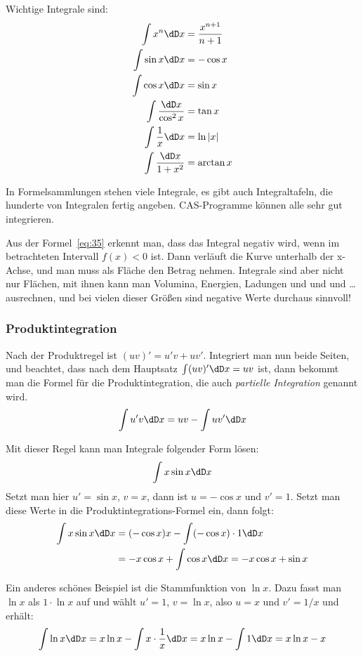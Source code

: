 Wichtige Integrale sind:
\begin{align}
  \label{eq:36}
  \int x^n\dD x&=\frac{x^{n+1}}{n+1}\\
  \int\sin x\dD x&= -\cos x\label{eq:37}\\
  \int\cos x\dD x&= \sin x\label{eq:38}\\
  \int\frac{\dD x}{\cos^2x}&= \tan x\label{eq:39}\\
  \int\frac{1}{x}\dD x&= \ln|x|\label{eq:40}\\
  \int\frac{\dD x}{1+x^2}&= \arctan x\label{eq:41}
\end{align}

In Formelsammlungen stehen viele Integrale, es gibt auch Integraltafeln, die
hunderte von Integralen fertig angeben. CAS-Programme können alle sehr gut
integrieren.

Aus der Formel~\eqref{eq:35} erkennt man, dass das Integral negativ wird, wenn
im betrachteten Intervall $f(x)<0$ ist. Dann verläuft die Kurve unterhalb der
x-Achse, und man muss als Fläche den Betrag nehmen. Integrale sind aber nicht
nur Flächen, mit ihnen kann man Volumina, Energien, Ladungen und und und
\ldots ausrechnen, und bei vielen dieser Größen sind negative Werte durchaus
sinnvoll!

\subsubsection{Produktintegration}
Nach der Produktregel ist $(uv)'=u'v+uv'$. Integriert man nun beide Seiten,
und beachtet, dass nach dem Hauptsatz $\int (uv)'\dD x=uv$ ist, dann bekommt
man die Formel für die Produktintegration, die auch \emph{partielle
  Integration} genannt wird.
\begin{equation}
  \label{eq:42}
  \int u'v\dD x= uv - \int uv'\dD x
\end{equation}

Mit dieser Regel kann man \zB Integrale folgender Form lösen:
\[
\int x\sin x\dD x
\]
Setzt man hier $u'=\sin x$, $v=x$, dann ist $u=-\cos x$ und $v'=1$. Setzt man
diese Werte in die Produktintegrations-Formel ein, dann folgt:
\begin{align*}
\int x\sin x\dD x&= (-\cos x)x-\int (-\cos x)\cdot1\dD x\\
&=-x\cos x+\int\cos x\dD x= -x\cos x+\sin x
\end{align*}

Ein anderes schönes Beispiel ist die Stammfunktion von $\ln x$. Dazu fasst man
$\ln x$ als $1\cdot\ln x$ auf und wählt $u'=1$, $v=\ln x$, also $u=x$ und
$v'=1/x$ und erhält:
\[
\int\ln x\dD x=x\ln x-\int x\cdot\frac{1}{x}\dD x=
x\ln x-\int 1\dD x=x\ln x -x
\]

